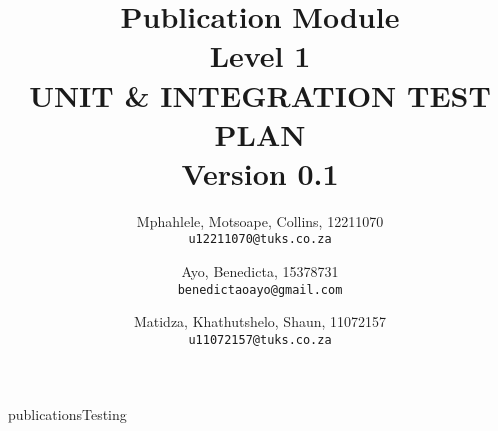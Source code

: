 \documentclass[a4paper]{article}
\title{Publication Module\\
	Level 1\\
	UNIT \& INTEGRATION TEST PLAN\\
	Version 0.1
}
\author{
	Mphahlele, Motsoape, Collins, 12211070\\
	\texttt{u12211070@tuks.co.za}
	\and
	Ayo, Benedicta, 15378731\\
	\texttt{benedictaoayo@gmail.com}
	\and
	Matidza, Khathutshelo, Shaun, 11072157\\
	\texttt{u11072157@tuks.co.za}
}
\begin{document}
\maketitle
\newpage
\tableofcontents

\newpage
{publicationsTesting}
\end{document}
